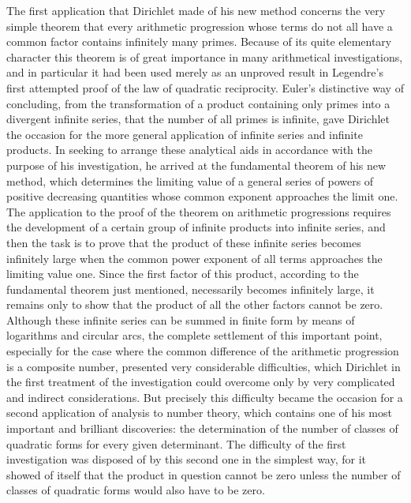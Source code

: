 \documentclass[11pt]{article}
\begin{document}
The first application that Dirichlet made of his new method concerns the very simple theorem that every arithmetic progression whose terms do not all have a common factor contains infinitely many primes. Because of its quite elementary character this theorem is of great importance in many arithmetical investigations, and in particular it had been used merely as an unproved result in Legendre's first attempted proof of the law of quadratic reciprocity. Euler's distinctive way of concluding, from the transformation of a product containing only primes into a divergent infinite series, that the number of all primes is infinite, gave Dirichlet the occasion for the more general application of infinite series and infinite products. In seeking to arrange these analytical aids in accordance with the purpose of his investigation, he arrived at the fundamental theorem of his new method, which determines the limiting value of a general series of powers of positive decreasing quantities whose common exponent approaches the limit one. The application to the proof of the theorem on arithmetic progressions requires the development of a certain group of infinite products into infinite series, and then the task is to prove that the product of these infinite series becomes infinitely large when the common power exponent of all terms approaches the limiting value one. Since the first factor of this product, according to the fundamental theorem just mentioned, necessarily becomes infinitely large, it remains only to show that the product of all the other factors cannot be zero. Although these infinite series can be summed in finite form by means of logarithms and circular arcs, the complete settlement of this important point, especially for the case where the common difference of the arithmetic progression is a composite number, presented very considerable difficulties, which Dirichlet in the first treatment of the investigation could overcome only by very complicated and indirect considerations. But precisely this difficulty became the occasion for a second application of analysis to number theory, which contains one of his most important and brilliant discoveries: the determination of the number of classes of quadratic forms for every given determinant. The difficulty of the first investigation was disposed of by this second one in the simplest way, for it showed of itself that the product in question cannot be zero unless the number of classes of quadratic forms would also have to be zero.
\end{document}
